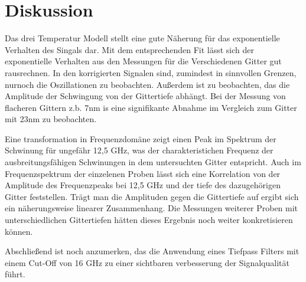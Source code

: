 \section{Diskussion}

Das drei Temperatur Modell stellt eine gute Näherung für das exponentielle Verhalten des Singals dar. Mit dem entsprechenden
Fit lässt sich der exponentielle Verhalten aus den Messungen für die Verschiedenen Gitter gut rausrechnen. 
In den korrigierten Signalen sind, zumindest in sinnvollen Grenzen, nurnoch die Oszillationen zu beobachten.
Außerdem ist zu beobachten, das die Amplitude der Schwingung von der Gittertiefe abhängt. Bei der Messung von flacheren Gittern z.b. 7nm is eine signifikante Abnahme im Vergleich zum Gitter mit 23nm
zu beobachten. 

\noindent Eine transformation in Frequenzdomäne zeigt einen Peak im Spektrum der Schwinung für ungefähr 12,5 GHz, was der charakteristichen Frequenz der ausbreitungsfähigen Schwinungen in dem untersuchten Gitter entspricht. Auch im Frequenzspektrum der einzelenen Proben lässt sich eine Korrelation von der 
Amplitude des Frequenzpeaks bei 12,5 GHz und der tiefe des dazugehörigen Gitter feststellen. Trägt man die Amplituden gegen die Gittertiefe auf ergibt sich ein näherungsweise linearer Zusammenhang. Die Messungen weiterer Proben mit unterschiedlichen Gittertiefen hätten dieses Ergebnis noch weiter konkretisieren können.

\noindent Abschließend ist noch anzumerken, das die Anwendung eines Tiefpass Filters mit einem Cut-Off von 16 GHz zu einer sichtbaren verbesserung der Signalqualität führt.

\printbibliography
